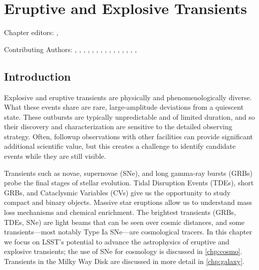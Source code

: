 
\chapter[Eruptive and Explosive Transients]{Eruptive and Explosive Transients}
\def\chpname{transients}\label{chp:\chpname}


Chapter editors:
,

Contributing Authors:
,
,
,
,
,
,
,
,
,
,
,
,
,
,
,

\section{Introduction}


Explosive and eruptive transients are physically and
phenomenologically diverse.   What these events share
are rare, large-amplitude deviations from a quiescent state.  These
outbursts are typically unpredictable and of limited duration, and so their
discovery and characterization are sensitive to the detailed observing
strategy.  Often, followup observations with other facilities can provide
significant additional scientific value, but this creates a challenge to
identify candidate events while they are still visible.

Transients such as novae, supernovae (SNe), and long gamma-ray bursts (GRBs)
probe the final stages of stellar evolution. Tidal Disruption Events
(TDEs), short GRBs, and
Cataclysmic Variables (CVs) give us the opportunity to study
compact and binary objects. Massive star eruptions allow us to understand
mass loss mechanisms and chemical enrichment. 
The brightest transients (GRBs, TDEs,
SNe) are light beams that can be seen over cosmic distances, and some
transients---most notably Type Ia SNe---are cosmological tracers.  
In this chapter we focus on LSST's potential to advance the astrophysics of
eruptive and explosive transients; the use of SNe for cosmology is
discussed in \autoref{chp:cosmo}. Transients in the Milky Way Disk are
discussed in more detail in \autoref{chp:galaxy}.

